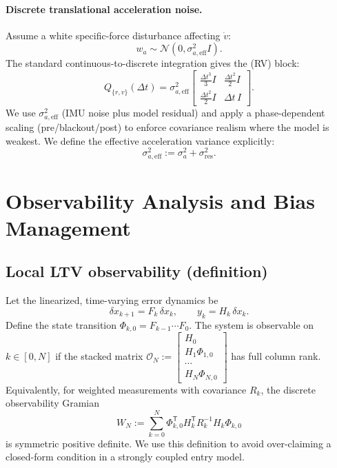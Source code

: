 \documentclass[10pt]{article}
\newcommand{\trans}{^{\mathsf T}}
\newcommand{\calN}{\mathcal{N}}
\newcommand{\defeq}{\mathrel{:=}}
\begin{document}
\paragraph{Discrete translational acceleration noise.}
Assume a white specific-force disturbance affecting $\dot v$:
\begin{equation}
  w_a\sim\calN(0,\sigma_{a,\text{eff}}^2 I).
\end{equation}
The standard continuous-to-discrete integration gives the (RV) block:
\begin{equation}
  Q_{\{r,v\}}(\Delta t) = \sigma_{a,\text{eff}}^2
  \begin{bmatrix}
    \tfrac{\Delta t^3}{3} I & \tfrac{\Delta t^2}{2} I\\
    \tfrac{\Delta t^2}{2} I & \Delta t\, I
  \end{bmatrix}.
\end{equation}
We use $\sigma_{a,\mathrm{eff}}^2$ (IMU noise plus model residual) and apply a phase-dependent scaling
(pre/blackout/post) to enforce covariance realism where the model is weakest.
We define the effective acceleration variance explicitly:
\begin{equation}
  \sigma_{a,\mathrm{eff}}^2 \defeq \sigma_a^2 + \sigma_{\mathrm{res}}^2.
\end{equation}

\section{Observability Analysis and Bias Management}
\subsection{Local LTV observability (definition)}
Let the linearized, time-varying error dynamics be
\begin{equation}
  \delta x_{k+1} = F_k\,\delta x_k,\qquad y_k = H_k\,\delta x_k.
\end{equation}
Define the state transition $\Phi_{k,0}=F_{k-1}\cdots F_0$.
The system is observable on $k\in[0,N]$ if the stacked matrix
$\mathcal O_N \defeq \begin{bmatrix}H_0\\ H_1\Phi_{1,0}\\ \cdots\\ H_N\Phi_{N,0}\end{bmatrix}$
has full column rank.
Equivalently, for weighted measurements with covariance $R_k$, the discrete observability Gramian
\begin{equation}
  W_N \defeq \sum_{k=0}^{N} \Phi_{k,0}\trans H_k\trans R_k^{-1} H_k \Phi_{k,0}
\end{equation}
is symmetric positive definite.
We use this definition to avoid over-claiming a closed-form condition in a strongly coupled entry model.
\end{document}

